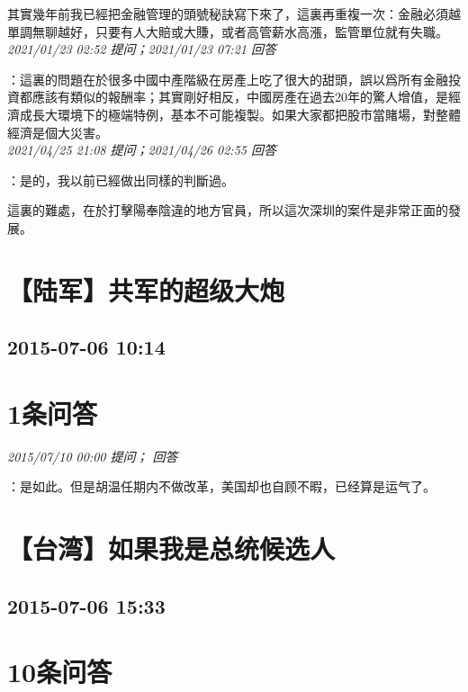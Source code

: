 \documentclass[twocolumn]{ctexart}
\begin{document}
其實幾年前我已經把金融管理的頭號秘訣寫下來了，這裏再重複一次：金融必須越單調無聊越好，只要有人大賠或大賺，或者高管薪水高漲，監管單位就有失職。
\\

\textit{\hfill\noindent\small 2021/01/23 02:52 提问；2021/01/23 07:21 回答}

：這裏的問題在於很多中國中產階級在房產上吃了很大的甜頭，誤以爲所有金融投資都應該有類似的報酬率；其實剛好相反，中國房產在過去20年的驚人增值，是經濟成長大環境下的極端特例，基本不可能複製。如果大家都把股市當賭場，對整體經濟是個大災害。
\\

\textit{\hfill\noindent\small 2021/04/25 21:08 提问；2021/04/26 02:55 回答}

：是的，我以前已經做出同樣的判斷過。

這裏的難處，在於打擊陽奉陰違的地方官員，所以這次深圳的案件是非常正面的發展。
\\


\section{【陆军】共军的超级大炮}
\subsection{2015-07-06 10:14}


\section{1条问答}

\textit{\hfill\noindent\small 2015/07/10 00:00 提问； 回答}

：是如此。但是胡温任期内不做改革，美国却也自顾不暇，已经算是运气了。\\


\section{【台湾】如果我是总统候选人}
\subsection{2015-07-06 15:33}


\section{10条问答}
\end{document}

